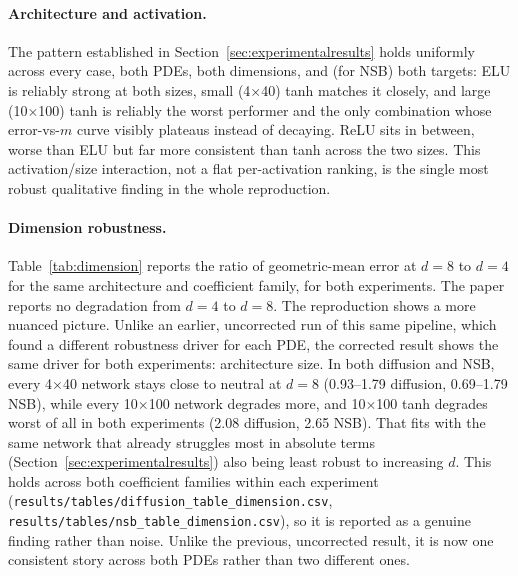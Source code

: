 \paragraph{Architecture and activation.} The pattern established in
Section~\ref{sec:experimentalresults} holds uniformly across every case,
both PDEs, both dimensions, and (for NSB) both targets: ELU is reliably
strong at both sizes, small (4$\times$40) tanh matches it closely, and
large (10$\times$100) tanh is reliably the worst performer and the only
combination whose error-vs-$m$ curve visibly plateaus instead of decaying.
ReLU sits in between, worse than ELU but far more consistent than tanh
across the two sizes. This activation/size interaction, not a flat
per-activation ranking, is the single most robust qualitative finding in
the whole reproduction.

\paragraph{Dimension robustness.} Table~\ref{tab:dimension} reports the
ratio of geometric-mean error at $d=8$ to $d=4$ for the same architecture
and coefficient family, for both experiments. The paper reports no
degradation from $d=4$ to $d=8$. The reproduction shows a more nuanced
picture. Unlike an earlier, uncorrected run of this same pipeline, which
found a different robustness driver for each PDE, the corrected result
shows the same driver for both experiments: architecture size. In both
diffusion and NSB, every 4$\times$40 network stays close to neutral at
$d=8$ (0.93--1.79 diffusion, 0.69--1.79 NSB), while every 10$\times$100
network degrades more, and 10$\times$100 tanh degrades worst of all in
both experiments (2.08 diffusion, 2.65 NSB). That fits with the same
network that already struggles most in absolute terms
(Section~\ref{sec:experimentalresults}) also being least robust to
increasing $d$. This holds across both coefficient families within each
experiment (\texttt{results/tables/diffusion\_table\_dimension.csv},
\texttt{results/tables/nsb\_table\_dimension.csv}), so it is reported as a
genuine finding rather than noise. Unlike the previous, uncorrected result,
it is now one consistent story across both PDEs rather than two different
ones.

